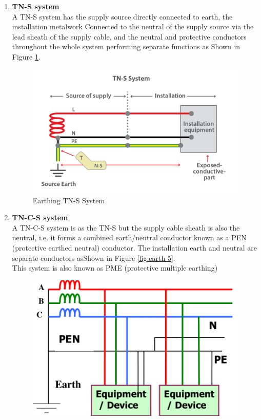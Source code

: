 \documentclass[12pt,fleqn]{book} %
\begin{document}
\begin{enumerate}
    \item \textbf{TN-S system}
   \\ A TN-S system has the supply source directly connected to earth, the installation metalwork Connected to the neutral of the supply source via the lead sheath of the supply cable, and the neutral and protective conductors throughout the whole system performing separate functions as Shown in Figure \ref{fig:earth 4}.
    \begin{figure}[!h]
    \centering
    \includegraphics[width=0.8\linewidth]{earth 4.png}
    \caption{Earthing TN-S System}
    \label{fig:earth 4}
\end{figure}
    \item \textbf{TN-C-S system}
    \\ A TN-C-S system is as the TN-S but the supply cable sheath is also the neutral, i.e. it forms a combined earth/neutral conductor known as a PEN (protective earthed neutral) conductor. The installation earth and neutral are separate conductors asShown in Figure \ref{fig:earth 5}.
    \\ This system is also known as PME (protective multiple earthing)
    \begin{figure}[!h]
    \centering
    \includegraphics[width=0.8\linewidth]{earth 5.png}

\end{figure}
\end{enumerate}
\end{document}
